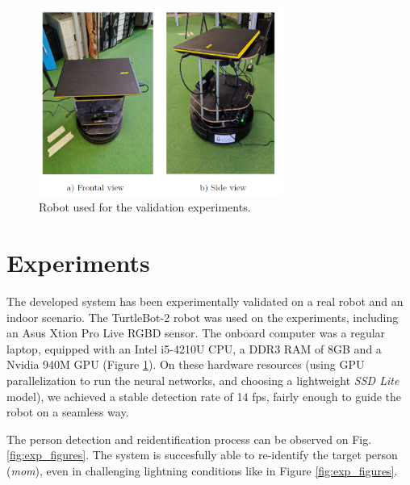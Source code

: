 \begin{figure}[h!]
	\centering
	\includegraphics[width=8cm]{images/exp_set}
	\caption{Robot used for the validation experiments.}
	\label{fig:exp_set}
\end{figure}


\section{Experiments}
\label{sec:experiments}

The developed system has been experimentally validated on a real robot and an indoor scenario. The TurtleBot-2 robot was used on the experiments, including an Asus Xtion Pro Live RGBD sensor. The onboard computer was a regular laptop, equipped with an Intel i5-4210U CPU, a DDR3 RAM of 8GB and a Nvidia 940M GPU (Figure \ref{fig:exp_set}). On these hardware resources (using GPU parallelization to run the neural networks, and choosing a lightweight \textit{SSD Lite }model), we achieved a stable detection rate of 14 fps, fairly enough to guide the robot on a seamless way. 



The person detection and reidentification process can be observed on Fig. \ref{fig:exp_figures}. The system is succesfully able to re-identify the target person (\textit{mom}), even in challenging lightning conditions like in Figure \ref{fig:exp_figures}.

